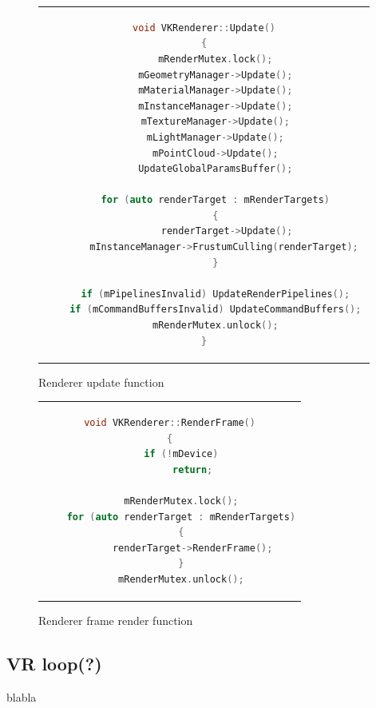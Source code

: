 \begin{figure}[htpb]
  \centering
  \begin{tabular}{c}
  \begin{lstlisting}[language=C++]
    void VKRenderer::Update()
{
	mRenderMutex.lock();
	mGeometryManager->Update();
	mMaterialManager->Update();
	mInstanceManager->Update();
	mTextureManager->Update();
	mLightManager->Update();
	mPointCloud->Update();
	UpdateGlobalParamsBuffer();

	for (auto renderTarget : mRenderTargets)
	{
		renderTarget->Update();
		mInstanceManager->FrustumCulling(renderTarget); 
	}

	if (mPipelinesInvalid) UpdateRenderPipelines();
	if (mCommandBuffersInvalid) UpdateCommandBuffers();
	mRenderMutex.unlock();
}
  \end{lstlisting}
  \end{tabular}
  \caption[Yeet]{Renderer update function}\label{fig:lst_VKRenderer_Update}
\end{figure}

\begin{figure}[htpb]
  \centering
  \begin{tabular}{c}
  \begin{lstlisting}[language=C++]
void VKRenderer::RenderFrame()
{
	if (!mDevice)
		return;

	mRenderMutex.lock();
	for (auto renderTarget : mRenderTargets)
	{
		renderTarget->RenderFrame();
	}
	mRenderMutex.unlock();
	\end{lstlisting}
  \end{tabular}
  \caption[Yeet]{Renderer frame render function}\label{fig:lst_VKRenderer_RenderFrame}
\end{figure}

\subsection{VR loop(?)}
blabla